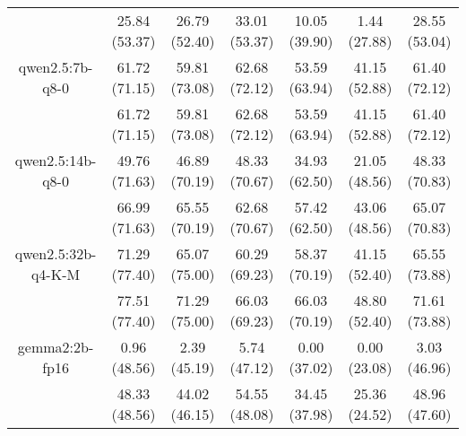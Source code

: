 \begin{table}[]
{\begin{tabular}{ccccccc}
        

        \multicolumn{1}{c|}{} & 25.84 (53.37) & 26.79 (52.40) & \multicolumn{1}{c|}{33.01 (53.37)} & 10.05 (39.90) & \multicolumn{1}{c|}{1.44 (27.88)} & 28.55 (53.04) \\
        \cline{1-7}
        

        \multicolumn{1}{c|}{qwen2.5:7b-q8-0} & 61.72 (71.15) & 59.81 (73.08) & \multicolumn{1}{c|}{62.68 (72.12)} & 53.59 (63.94) & \multicolumn{1}{c|}{41.15 (52.88)} & 61.40 (72.12) \\
        
        

        \multicolumn{1}{c|}{} & 61.72 (71.15) & 59.81 (73.08) & \multicolumn{1}{c|}{62.68 (72.12)} & 53.59 (63.94) & \multicolumn{1}{c|}{41.15 (52.88)} & 61.40 (72.12) \\
        \cline{1-7}
        

        \multicolumn{1}{c|}{qwen2.5:14b-q8-0} & 49.76 (71.63) & 46.89 (70.19) & \multicolumn{1}{c|}{48.33 (70.67)} & 34.93 (62.50) & \multicolumn{1}{c|}{21.05 (48.56)} & 48.33 (70.83) \\
        
        

        \multicolumn{1}{c|}{} & 66.99 (71.63) & 65.55 (70.19) & \multicolumn{1}{c|}{62.68 (70.67)} & 57.42 (62.50) & \multicolumn{1}{c|}{43.06 (48.56)} & 65.07 (70.83) \\
        \cline{1-7}
        

        \multicolumn{1}{c|}{qwen2.5:32b-q4-K-M} & 71.29 (77.40) & 65.07 (75.00) & \multicolumn{1}{c|}{60.29 (69.23)} & 58.37 (70.19) & \multicolumn{1}{c|}{41.15 (52.40)} & 65.55 (73.88) \\
        
        

        \multicolumn{1}{c|}{} & 77.51 (77.40) & 71.29 (75.00) & \multicolumn{1}{c|}{66.03 (69.23)} & 66.03 (70.19) & \multicolumn{1}{c|}{48.80 (52.40)} & 71.61 (73.88) \\
        \cline{1-7}
        

        \multicolumn{1}{c|}{gemma2:2b-fp16} & 0.96 (48.56) & 2.39 (45.19) & \multicolumn{1}{c|}{5.74 (47.12)} & 0.00 (37.02) & \multicolumn{1}{c|}{0.00 (23.08)} & 3.03 (46.96) \\
        
        

        \multicolumn{1}{c|}{} & 48.33 (48.56) & 44.02 (46.15) & \multicolumn{1}{c|}{54.55 (48.08)} & 34.45 (37.98) & \multicolumn{1}{c|}{25.36 (24.52)} & 48.96 (47.60) \\
        \cline{1-7}
        


\end{tabular}}
\end{table}
